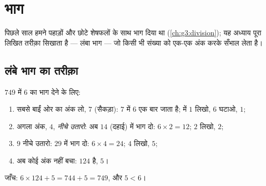 \chapter{भाग}\label{ch:g4:division}

पिछले साल हमने पहाड़ों और छोटे शेषफलों के साथ भाग दिया था
(\cref{ch:g3:division}); यह अध्याय पूरा लिखित तरीक़ा सिखाता
है --- लंबा भाग --- जो किसी भी संख्या को एक-एक अंक करके सँभाल
लेता है।

\section{लंबे भाग का तरीक़ा}

\begin{method}[एक अंक की संख्या से लंबा भाग]\label{met:g4:division:method}
$749$ में $6$ का भाग देने के लिए:
\begin{enumerate}
  \item सबसे बाईं ओर का अंक लो, $7$ (सैकड़ा): $7$ में $6$ एक
        बार जाता है;  में $1$ लिखो, $6$ घटाओ,
         $1$;
  \item अगला अंक, $4$, \emph{नीचे उतारो}: अब $14$ (दहाई) में
        भाग दो: $6 \times 2 = 12$; $2$ लिखो,  $2$;
  \item $9$ नीचे उतारो: $29$ में भाग दो: $6 \times 4 = 24$;
        $4$ लिखो,  $5$;
  \item अब कोई अंक नहीं बचा:  $124$ है,  $5$।
\end{enumerate}
जाँच: $6 \times 124 + 5 = 744 + 5 = 749$, और $5 < 6$।
\end{method}

